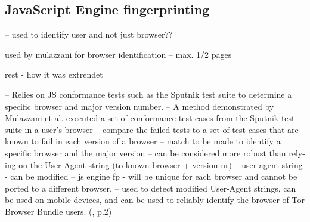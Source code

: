 


 
\subsection{JavaScript Engine fingerprinting}
-- used to identify user and not just browser??

used by mulazzani for browser identification
-- max. 1/2 pages

rest - how it was extrendet


-- Relies on JS conformance tests such as the Sputnik test suite to determine a specific browser and major version number.
-- A method demonstrated by Mulazzani et al. executed a set of conformance test cases from the Sputnik test suite in a user’s browser
-- compare the failed tests to a set of test cases that are known to fail in each version of a browser
-- match to be made to identify a specific browser and the major version
-- can be considered more robust than rely-ing on the User-Agent string (to known browser + version nr) -- user agent string - can be modified
-- js engine fp -  will be unique for each browser and cannot be ported to a different browser. 
-- used to detect modified User-Agent strings, can be used on mobile devices, and can be used to reliably identify the browser of Tor Browser Bundle users.
(\textcite{upi15}, p.2)


